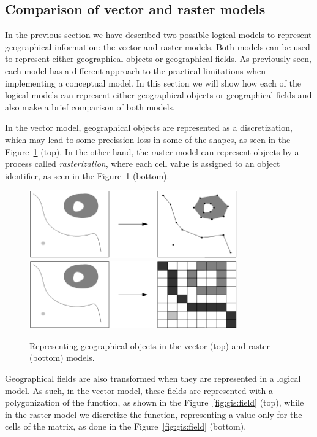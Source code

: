     \subsection{Comparison of vector and raster models}
    In the previous section we have described two possible logical models to represent geographical information: the vector and raster models. Both models can be used to represent either geographical objects or geographical fields. As previously seen, each model has a different approach to the practical limitations when implementing a conceptual model. In this section we will show how each of the logical models can represent either geographical objects or geographical fields and also make a brief comparison of both models.
    
    In the vector model, geographical objects are represented as a discretization, which may lead to some precission loss in some of the shapes, as seen in the Figure~\ref{fig:gis:object} (top). In the other hand, the raster model can represent objects by a process called \textit{rasterization}, where each cell value is assigned to an object identifier, as seen in the Figure~\ref{fig:gis:object} (bottom).
    
    \begin{figure}[ht]
		\begin{center}
			{\includegraphics[width=0.8\textwidth]{figures/obj_vector.png}}
			{\includegraphics[width=0.8\textwidth]{figures/obj_raster.png}}
		\end{center}
		\caption{Representing geographical objects in the vector (top) and raster (bottom) models.}
		\label{fig:gis:object}
	\end{figure}
	
	Geographical fields are also transformed when they are represented in a logical model. As such, in the vector model, these fields are represented with a polygonization of the function, as shown in the Figure~\ref{fig:gis:field} (top), while in the raster model we discretize the function, representing a value only for the cells of the matrix, as done in the Figure~\ref{fig:gis:field} (bottom).
    
